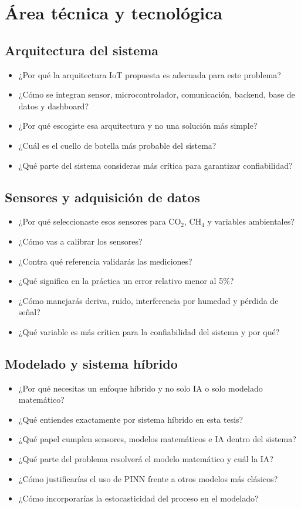 \documentclass[11pt]{article}
\begin{document}
\section{Área técnica y tecnológica}

\subsection*{Arquitectura del sistema}
\begin{itemize}[leftmargin=*]
    \item ¿Por qué la arquitectura IoT propuesta es adecuada para este problema?
    \item ¿Cómo se integran sensor, microcontrolador, comunicación, backend, base de datos y dashboard?
    \item ¿Por qué escogiste esa arquitectura y no una solución más simple?
    \item ¿Cuál es el cuello de botella más probable del sistema?
    \item ¿Qué parte del sistema consideras más crítica para garantizar confiabilidad?
\end{itemize}

\subsection*{Sensores y adquisición de datos}
\begin{itemize}[leftmargin=*]
    \item ¿Por qué seleccionaste esos sensores para CO$_2$, CH$_4$ y variables ambientales?
    \item ¿Cómo vas a calibrar los sensores?
    \item ¿Contra qué referencia validarás las mediciones?
    \item ¿Qué significa en la práctica un error relativo menor al 5\%?
    \item ¿Cómo manejarás deriva, ruido, interferencia por humedad y pérdida de señal?
    \item ¿Qué variable es más crítica para la confiabilidad del sistema y por qué?
\end{itemize}

\subsection*{Modelado y sistema híbrido}
\begin{itemize}[leftmargin=*]
    \item ¿Por qué necesitas un enfoque híbrido y no solo IA o solo modelado matemático?
    \item ¿Qué entiendes exactamente por sistema híbrido en esta tesis?
    \item ¿Qué papel cumplen sensores, modelos matemáticos e IA dentro del sistema?
    \item ¿Qué parte del problema resolverá el modelo matemático y cuál la IA?
    \item ¿Cómo justificarías el uso de PINN frente a otros modelos más clásicos?
    \item ¿Cómo incorporarías la estocasticidad del proceso en el modelado?
\end{itemize}
\end{document}
